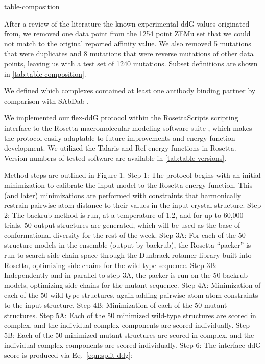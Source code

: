 {table-composition}

After a review of the literature the known experimental ddG values originated from, we removed one data point from the 1254 point ZEMu set that we could not match to the original reported affinity value. We also removed 5 mutations that were duplicates and 8 mutations that were reverse mutations of other data points, leaving us with a test set of 1240 mutations. Subset definitions are shown in \cref{tab:table-composition}.

We defined which complexes contained at least one antibody binding partner by comparison with SAbDab \cite{dunbar_sabdab:_2014}.

We implemented our flex-ddG protocol within the RosettaScripts scripting interface to the Rosetta macromolecular modeling software suite \cite{fleishman_rosettascripts:_2011}, which makes the protocol easily adaptable to future improvements and energy function development. We utilized the Talaris \cite{leaver-fay_chapter_2013,song_structure-guided_2011,shapovalov_smoothed_2011} and Ref\cite{alford_rosetta_2017} energy functions in Rosetta. Version numbers of tested software are available in \cref{tab:table-versions}.

Method steps are outlined in Figure 1. Step 1: The protocol begins with an initial minimization to calibrate the input model to the Rosetta energy function. This (and later) minimizations are performed with constraints that harmonically restrain pairwise atom distance to their values in the input crystal structure. Step 2: The backrub method is run, at a temperature of 1.2, and for up to 60,000 trials. 50 output structures are generated, which will be used as the base of conformational diversity for the rest of the week. Step 3A: For each of the 50 structure models in the ensemble (output by backrub), the Rosetta ``packer'' is run to search side chain space through the Dunbrack rotamer library built into Rosetta\cite{shapovalov_smoothed_2011}, optimizing side chains for the wild type sequence. Step 3B: Independently and in parallel to step 3A, the packer is run on the 50 backrub models, optimizing side chains for the mutant sequence. Step 4A: Minimization of each of the 50 wild-type structures, again adding pairwise atom-atom constraints to the input structure. Step 4B: Minimization of each of the 50 mutant structures. Step 5A: Each of the 50 minimized wild-type structures are scored in complex, and the individual complex components are scored individually. Step 5B: Each of the 50 minimized mutant structures are scored in complex, and the individual complex components are scored individually. Step 6: The interface ddG score is produced via Eq.~\ref{eqn:split-ddg}:

